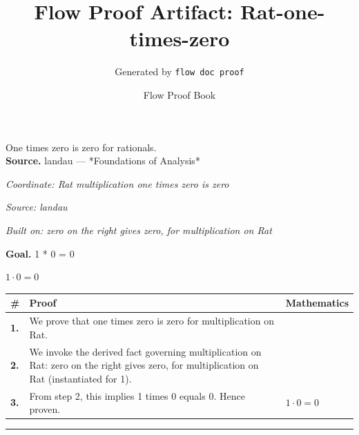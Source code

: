 \documentclass[11pt]{article}
\title{Flow Proof Artifact: Rat-one-times-zero}
\author{Generated by \texttt{flow doc proof}}
\date{Flow Proof Book}
\theoremstyle{definition}
\begin{document}
\maketitle
One times zero is zero for rationals.\\[0.5em]
\textbf{Source.} landau — *Foundations of Analysis*\\[0.5em]
\bigskip
{}\par
\smallskip\noindent\textit{Coordinate: Rat \cdot multiplication \cdot one times zero is zero}\par
\smallskip\noindent\textit{Source: landau}\par
\smallskip\noindent\textit{Built on: zero on the right gives zero, for multiplication on Rat}\par
\medskip
\noindent\textbf{Goal.} 1 * 0 = 0\par
\noindent$\displaystyle 1 \cdot 0 = 0$\par
\medskip
\noindent
\begin{tabular}{@{} >{\raggedright\arraybackslash}p{} >{\raggedright\arraybackslash}p{} >{\raggedleft\arraybackslash}p{} @{}}
\textbf{\#} & \textbf{Proof} & \textbf{Mathematics} \\
\midrule
\textbf{1.} & We prove that one times zero is zero for multiplication on Rat. & \\[0.45em]
\textbf{2.} & We invoke the derived fact governing multiplication on Rat: zero on the right gives zero, for multiplication on Rat (instantiated for 1). & \\[0.45em]
\textbf{3.} & From step 2, this implies 1 times 0 equals 0. Hence proven. & $\displaystyle 1 \cdot 0 = 0$ \\[0.45em]
\bottomrule
\end{tabular}
\label{thm:Rat-multiplication-one_times_zero_is_zero}
\par\medskip\hrule
\end{document}
